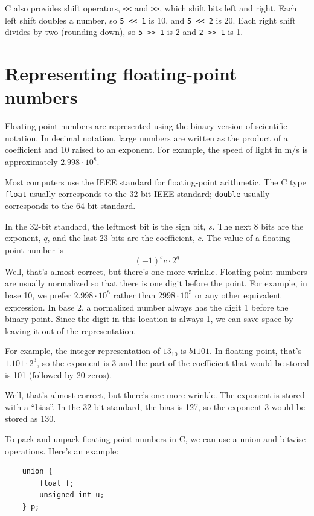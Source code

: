 \documentclass[12pt]{book}
\begin{document}
{%

C also provides shift operators, {\tt <<} and {\tt >>}, which shift
bits left and right.  Each left shift doubles a number, so
{\tt 5 << 1} is 10, and {\tt 5 << 2} is 20.  Each right shift
divides by two (rounding down), so {\tt 5 >> 1} is 2 and
{\tt 2 >> 1} is 1.


\section{Representing floating-point numbers}

Floating-point numbers are represented using the binary
version of scientific notation.  In decimal notation, large
numbers are written as the product of a coefficient and 10 raised
to an exponent.  For example, the speed of light in m/s is
approximately $2.998 \cdot 10^8$.

Most computers use the IEEE standard for floating-point
arithmetic.  The C type {\tt float} usually corresponds
to the 32-bit IEEE standard; {\tt double} usually corresponds
to the 64-bit standard.

In the 32-bit standard, the leftmost bit is the sign bit, $s$.
The next 8 bits are the exponent, $q$, and the last 23 bits are
the coefficient, $c$.  The value of a floating-point number is
%
\[ (-1)^s c \cdot 2^q \]
%
Well, that's almost correct, but there's one more wrinkle.
Floating-point numbers are usually normalized so that there is
one digit before the point.  For example, in base 10, we prefer
$2.998 \cdot 10^8$ rather than $2998 \cdot 10^5$ or any other
equivalent expression.  In base 2, a normalized number always
has the digit 1 before the binary point.  Since the digit in
this location is always 1, we can save space by leaving it
out of the representation.

For example, the integer representation of $13_{10}$ is $b1101$.
In floating point, that's $1.101 \cdot 2^3$, so the exponent
is 3 and the part of the coefficient that would be stored
is 101 (followed by 20 zeros).

Well, that's almost correct, but there's one more wrinkle.
The exponent is stored with a ``bias''.  In the 32-bit standard,
the bias is 127, so the exponent 3 would be stored as 130.

To pack and unpack floating-point numbers in C, we can use a 
union and bitwise operations.  Here's an example:
%
\begin{verbatim}
    union {
        float f;
        unsigned int u;
    } p;


\end{verbatim}}
\end{document}
